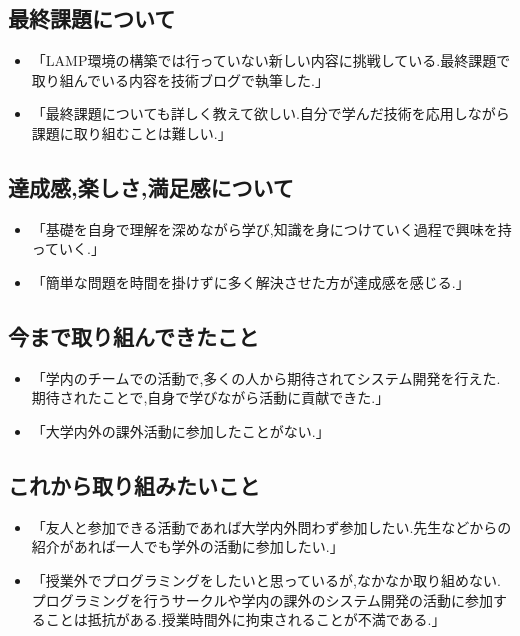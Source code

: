 \documentclass[11pt, a4paper]{jreport}
\begin{document}
\subsection{最終課題について}\label{saisyuunituite}

\begin{itemize}
\item 「LAMP環境の構築では行っていない新しい内容に挑戦している.最終課題で取り組んでいる内容を技術ブログで執筆した.」
\item 「最終課題についても詳しく教えて欲しい.自分で学んだ技術を応用しながら課題に取り組むことは難しい.」
\end{itemize}

\subsection{達成感,楽しさ,満足感について}

\begin{itemize}
\item 「基礎を自身で理解を深めながら学び,知識を身につけていく過程で興味を持っていく.」
\item 「簡単な問題を時間を掛けずに多く解決させた方が達成感を感じる.」
\end{itemize}

\subsection{今まで取り組んできたこと}

\begin{itemize}
\item 「学内のチームでの活動で,多くの人から期待されてシステム開発を行えた.期待されたことで,自身で学びながら活動に貢献できた.」
\item 「大学内外の課外活動に参加したことがない.」
\end{itemize}

\subsection{これから取り組みたいこと}

\begin{itemize}
\item 「友人と参加できる活動であれば大学内外問わず参加したい.先生などからの紹介があれば一人でも学外の活動に参加したい.」
\item 「授業外でプログラミングをしたいと思っているが,なかなか取り組めない.プログラミングを行うサークルや学内の課外のシステム開発の活動に参加することは抵抗がある.授業時間外に拘束されることが不満である.」
\end{itemize}
\end{document}

